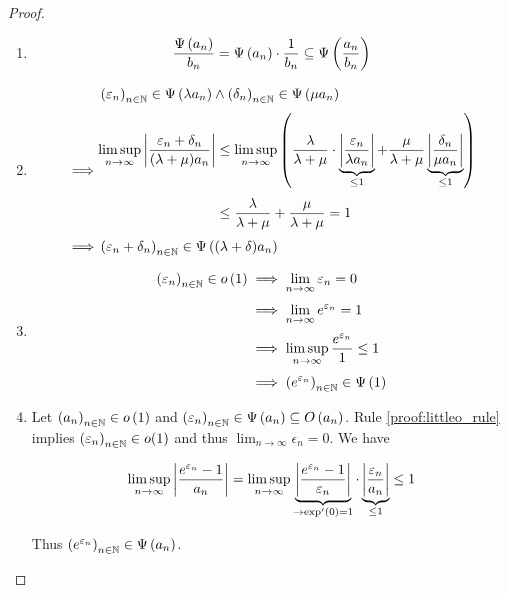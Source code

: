 \begin{proof}
\begin{enumerate}
    \item

      \begin{align}
        \frac{\Psi\left( {a_n} \right)}{b_n} = \Psi\left( {a_n} \right) \cdot \frac{1}{b_n} \subseteq \Psi\left( {\frac{a_n}{b_n}} \right)
      \end{align}

    \item

      \begin{align}
        & \seq{\epsilon_n} \in \bigpsi{\lambda a_n} \land \seq{\delta_n} \in \bigpsi{\mu a_n} \nl
        \implies &
        \begin{aligned}
          \limsup_{n\to\infty} \abs{\frac{\epsilon_n+\delta_n}{(\lambda+\mu)a_n}} & \le \limsup_{n\to\infty} \left( \frac{\lambda}{\lambda + \mu} \cdot \underbrace{\abs{\frac{\epsilon_n}{\lambda a_n}}}_{\le 1} + \frac{\mu}{\lambda + \mu} \underbrace{\abs{\frac{\delta_n}{\mu a_n}}}_{\le 1} \right) \nl
          &\le \frac{\lambda}{\lambda+\mu} + \frac{\mu}{\lambda+\mu} = 1
        \end{aligned} \nl
        \implies & \seq{\epsilon_n+\delta_n} \in \bigpsi{(\lambda+\delta)a_n}
      \end{align}
    \item

      \begin{align}
        \seq{\epsilon_n} \in \littleo{1} & \implies \lim_{n\to\infty} \epsilon_n = 0 \nl
        & \implies \lim_{n\to\infty} e^{\epsilon_n} = 1 \nl
        & \implies \limsup_{n\to\infty} \frac{e^{\epsilon_n}}{1} \le 1 \nl
        & \implies \seq{e^{\epsilon_n}} \in \bigpsi{1}
      \end{align}

    \item

      Let $\left({a_n}\right)_{{n}\in\mathbb N}\in o\left( {1} \right)$ and $\left({\varepsilon_n}\right)_{{n}\in\mathbb N}\in\Psi\left( {a_n} \right)\subseteq O\left( {a_n} \right)$. Rule \ref{proof:littleo_rule} implies $\left({\varepsilon_n}\right)_{{n}\in\mathbb N} \in o(1)$ and thus $\lim_{n\to\infty} \epsilon_n = 0$. We have

      \begin{align}
        \limsup_{n\to\infty} \left|{\frac{e^{\varepsilon_n}-1}{a_n}}\right| = \limsup_{n\to\infty} \underbrace{\left|{\frac{e^{\varepsilon_n}-1}{\varepsilon_n}}\right|}_{\to \exp'(0)=1} \cdot \underbrace{\left|{\frac{\varepsilon_n}{a_n}}\right|}_{\le 1} \le 1
      \end{align}

      \noindent Thus $\left({e^{\varepsilon_n}}\right)_{{n}\in\mathbb N} \in \Psi\left( {a_n} \right)$.
  \end{enumerate}
\end{proof}
